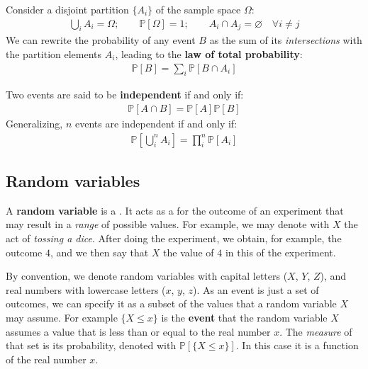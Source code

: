 \documentclass[../template.tex]{subfiles}
\begin{document}
Consider a disjoint partition $\{A_i\}$ of the sample space $\Omega$:
\begin{align*}
    \bigcup_{i} A_i = \Omega; \qquad \mathbb{P}[\Omega] = 1; \qquad A_i \cap A_j = \varnothing\quad \forall i \neq j
\end{align*}
We can rewrite the probability of any event $B$ as the sum of its \textit{intersections} with the partition elements $A_i$, leading to the \textbf{law of total probability}:  
\begin{align*}
    \mathbb{P}[B] = \sum_{i} \mathbb{P}[B \cap A_i]
\end{align*}

Two events are said to be \textbf{independent} if and only if:
\begin{align*}
    \mathbb{P}[A \cap B] = \mathbb{P}[A] \mathbb{P}[B]
\end{align*}
Generalizing, $n$ events are independent if and only if:
\begin{align*}
    \mathbb{P}\left[\bigcup_i^n A_i\right] = \prod_{i}^n \mathbb{P}[A_i]
\end{align*}

\subsection{Random variables}
A \textbf{random variable} is a . It acts as a  for the outcome of an experiment that may result in a \textit{range} of possible values. For example, we may denote with $X$ the act of \textit{tossing a dice}. After doing the experiment, we obtain, for example, the outcome $4$, and we then say that $X$  the value of $4$ in this  of the experiment.

\medskip

By convention, we denote random variables with capital letters ($X$, $Y$, $Z$), and real numbers with lowercase letters ($x$, $y$, $z$). As an event is just a set of outcomes, we can specify it as a subset of the values that a random variable $X$ may assume. For example $\{X \leq x\}$ is the \textbf{event} that the random variable $X$ assumes a value that is less than or equal to the real number $x$. The \textit{measure} of that set is its probability, denoted with $\mathbb{P}[\{X \leq x\}]$. In this case it is a function of the real number $x$.
\end{document}
